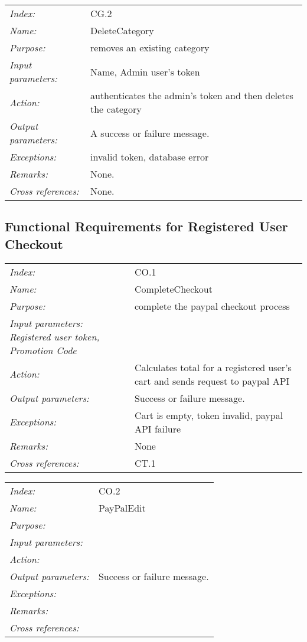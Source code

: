 \documentclass[10pt,letter]{article}
\begin{document}
\begin{tabularx}{\textwidth}{l X}
    \it{Index:} & CG.2 \\
    \it{Name:} &  DeleteCategory\\
    \it{Purpose:} & removes an existing category\\
    \it{Input parameters:} &  Name, Admin user's token\\
    \it{Action:} &  authenticates the admin's token and then deletes the category\\
    \it{Output parameters:} & A success or failure message. \\
    \it{Exceptions:} & invalid token, database error\\
    \it{Remarks:} & None. \\
    \it{Cross references:} & None. \\
    \hline
\end{tabularx}

\subsection{Functional Requirements for Registered User Checkout}

\begin{tabularx}{\textwidth}{l X}
    \it{Index:} & CO.1 \\
    \it{Name:} &  CompleteCheckout\\
    \it{Purpose:} & complete the paypal checkout process \\
    \it{Input parameters:}  Registered user token, Promotion Code\\
    \it{Action:} & Calculates total for a registered user's cart and sends request to paypal API\\
    \it{Output parameters:} & Success or failure message. \\
    \it{Exceptions:} & Cart is empty, token invalid, paypal API failure \\
    \it{Remarks:} & None\\
    \it{Cross references:} & CT.1  \\
    \hline
\end{tabularx}

\begin{tabularx}{\textwidth}{l X}
    \it{Index:} & CO.2 \\
    \it{Name:} & PayPalEdit \\
    \it{Purpose:} &  \\
    \it{Input parameters:}  \\
    \it{Action:} & \\
    \it{Output parameters:} & Success or failure message. \\
    \it{Exceptions:} &   \\
    \it{Remarks:} & \\
    \it{Cross references:} &  \\
    \hline
\end{tabularx}
\end{document}
